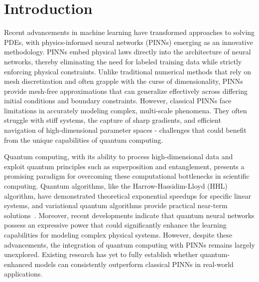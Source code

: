 \section{Introduction}

Recent advancements in machine learning have transformed approaches to solving PDEs, with physics-informed neural networks (PINNs) emerging as an innovative methodology. PINNs embed physical laws directly into the architecture of neural networks, thereby eliminating the need for labeled training data while strictly enforcing physical constraints. Unlike traditional numerical methods that rely on mesh discretization and often grapple with the curse of dimensionality, PINNs provide mesh-free approximations that can generalize effectively across differing initial conditions and boundary constraints. However, classical PINNs face limitations in accurately modeling complex, multi-scale phenomena. They often struggle with stiff systems, the capture of sharp gradients, and efficient navigation of high-dimensional parameter spaces - challenges that could benefit from the unique capabilities of quantum computing.

Quantum computing, with its ability to process high-dimensional data and exploit quantum principles such as superposition and entanglement, presents a promising paradigm for overcoming these computational bottlenecks in scientific computing. Quantum algorithms, like the Harrow-Hassidim-Lloyd (HHL) algorithm, have demonstrated theoretical exponential speedups for specific linear systems, and variational quantum algorithms provide practical near-term solutions~\cite{mitarai2018quantum, havlivcek2019supervised, cerezo2021variational}. Moreover, recent developments indicate that quantum neural networks possess an expressive power that could significantly enhance the learning capabilities for modeling complex physical systems.
However, despite these advancements, the integration of quantum computing with PINNs remains largely unexplored. Existing research has yet to fully establish whether quantum-enhanced models can consistently outperform classical PINNs in real-world applications.


